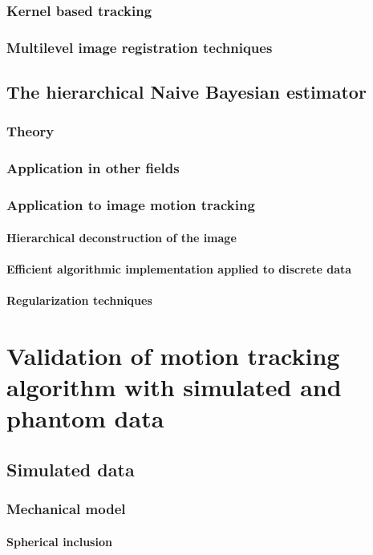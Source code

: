 \documentclass[12pt,twoside]{withesis}
\begin{document}
\subsection{Kernel based tracking}
\subsection{Multilevel image registration techniques}
\section{The hierarchical Naive Bayesian estimator}
\subsection{Theory}
\subsection{Application in other fields}
\subsection{Application to image motion tracking}
\subsubsection{Hierarchical deconstruction of the image}
\subsubsection{Efficient algorithmic implementation applied to discrete data}
\subsubsection{Regularization techniques}


\chapter{Validation of motion tracking algorithm with simulated and phantom
data}

\section{Simulated data}
\subsection{Mechanical model}
\subsubsection{Spherical inclusion}
\end{document}
